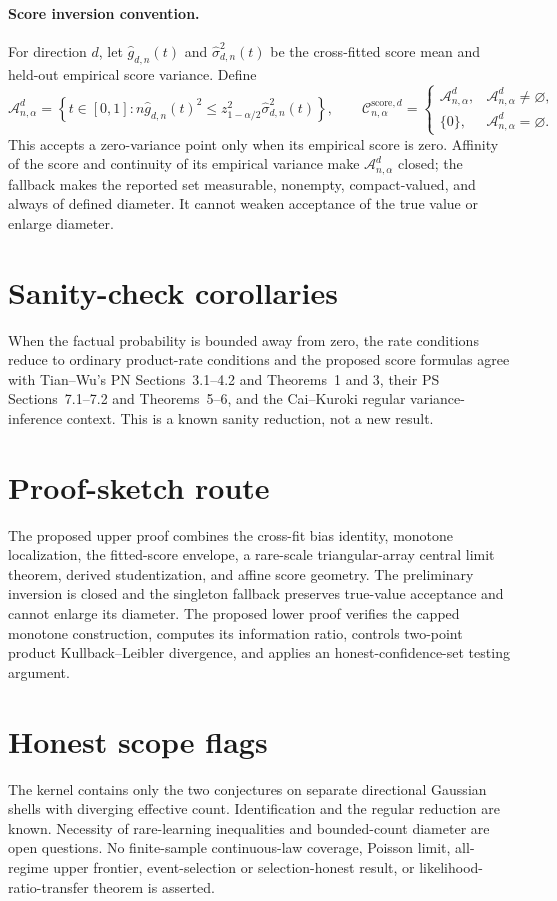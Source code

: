 \documentclass[11pt]{article}
\begin{document}
\paragraph{Score inversion convention.}
For direction \(d\), let \(\widehat g_{d,n}(t)\) and \(\widehat\sigma^2_{d,n}(t)\) be the cross-fitted score mean and held-out empirical score variance.  Define
\[
\mathcal A_{n,\alpha}^d=
\left\{t\in[0,1]:n\widehat g_{d,n}(t)^2
\le z_{1-\alpha/2}^2\widehat\sigma_{d,n}^2(t)\right\},
\qquad
\mathcal C_{n,\alpha}^{\mathrm{score},d}=
\begin{cases}
\mathcal A_{n,\alpha}^d,&\mathcal A_{n,\alpha}^d\ne\varnothing,\\
\{0\},&\mathcal A_{n,\alpha}^d=\varnothing.
\end{cases}
\]
This accepts a zero-variance point only when its empirical score is zero.  Affinity of the score and continuity of its empirical variance make \(\mathcal A_{n,\alpha}^d\) closed; the fallback makes the reported set measurable, nonempty, compact-valued, and always of defined diameter.  It cannot weaken acceptance of the true value or enlarge diameter.

\section{Sanity-check corollaries}
When the factual probability is bounded away from zero, the rate conditions reduce to ordinary product-rate conditions and the proposed score formulas agree with Tian--Wu's PN Sections~3.1--4.2 and Theorems~1 and 3, their PS Sections~7.1--7.2 and Theorems~5--6, and the Cai--Kuroki regular variance-inference context.  This is a known sanity reduction, not a new result.

\section{Proof-sketch route}
The proposed upper proof combines the cross-fit bias identity, monotone localization, the fitted-score envelope, a rare-scale triangular-array central limit theorem, derived studentization, and affine score geometry.  The preliminary inversion is closed and the singleton fallback preserves true-value acceptance and cannot enlarge its diameter.  The proposed lower proof verifies the capped monotone construction, computes its information ratio, controls two-point product Kullback--Leibler divergence, and applies an honest-confidence-set testing argument.

\section{Honest scope flags}
The kernel contains only the two conjectures on separate directional Gaussian shells with diverging effective count.  Identification and the regular reduction are known.  Necessity of rare-learning inequalities and bounded-count diameter are open questions.  No finite-sample continuous-law coverage, Poisson limit, all-regime upper frontier, event-selection or selection-honest result, or likelihood-ratio-transfer theorem is asserted.
\end{document}
